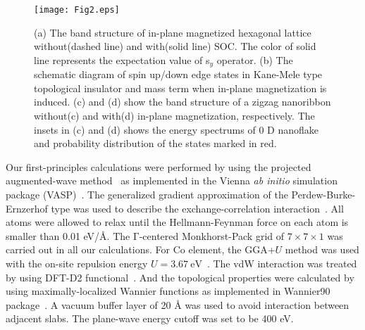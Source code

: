 \documentclass[aps,prl,twocolumn,showpacs,superscriptaddress]{revtex4-1}
\begin{document}
\begin{figure}
  \texttt{[image: Fig2.eps]}
  \caption{(a) The band structure of in-plane magnetized hexagonal lattice without(dashed line) and with(solid line) SOC. The color of solid line represents the expectation value of s$_y$ operator. (b) The schematic diagram of spin up/down edge states in Kane-Mele type topological insulator and mass term when in-plane magnetization is induced. (c) and (d) show the band structure of a zigzag nanoribbon without(c) and with(d) in-plane magnetization, respectively. The insets in (c) and (d) shows the energy spectrums of 0 D nanoflake and probability distribution of the states marked in red.}
	\label{Fig2}
\end{figure}

Our first-principles calculations were performed by using the projected augmented-wave method~\cite{PAV} as implemented in the Vienna \textit{ab initio} simulation package (VASP)~\cite{VASP}. The generalized gradient approximation of the Perdew-Burke-Ernzerhof type was used to describe the exchange-correlation interaction~\cite{PBE}. All atoms were allowed to relax until the Hellmann-Feynman force on each atom is smaller than 0.01 eV/\AA. The $\mathrm{\Gamma}$-centered Monkhorst-Pack grid of $\mathrm{7\times 7\times 1}$ was carried out in all our calculations. For Co element, the GGA+$U$ method was used with the on-site repulsion energy $U=3.67~\mathrm{eV}$~\cite{DFT_CoBr2}. The vdW interaction was treated by using DFT-D2 functional~\cite{DFT-D2}. And the topological properties were calculated by using maximally-localized Wannier functions as implemented in Wannier90 package~\cite{wannier90}. A vacuum buffer layer of 20 {\AA} was used to avoid interaction between adjacent slabs. The plane-wave energy cutoff was set to be 400 eV.
\end{document}
